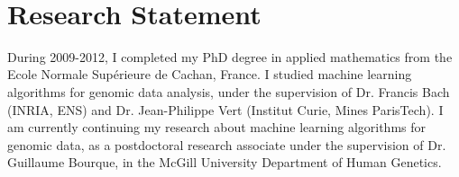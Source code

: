 \documentclass{article}
\begin{document}
\mbox{ }

\vspace{ -0.5cm}

\section*{\centering Research Statement}

During 2009-2012, I completed my PhD degree in applied mathematics
from the Ecole Normale Sup\'erieure de Cachan, France. I studied
machine learning algorithms for genomic data analysis, under the
supervision of Dr. Francis Bach (INRIA, ENS) and Dr. Jean-Philippe
Vert (Institut Curie, Mines ParisTech). I am currently continuing my
research about machine learning algorithms for genomic data, as a
postdoctoral research associate under the supervision of Dr. Guillaume
Bourque, in the McGill University Department of Human Genetics.
\end{document}
